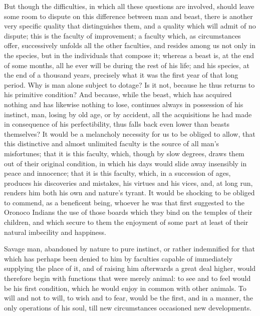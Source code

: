 \documentclass[11pt,twocolumn]{ltugboat}
\begin{document}
But though the difficulties, in which all these questions are
involved, should leave some room to dispute on this difference between
man and beast, there is another very specific quality that
distinguishes them, and a quality which will admit of no dispute; this
is the faculty of improvement; a faculty which, as circumstances
offer, successively unfolds all the other faculties, and resides among
us not only in the species, but in the individuals that compose it;
whereas a beast is, at the end of some months, all he ever will be
during the rest of his life; and his species, at the end of a thousand
years, precisely what it was the first year of that long period. Why
is man alone subject to dotage? Is it not, because he thus returns to
his primitive condition? And because, while the beast, which has
acquired nothing and has likewise nothing to lose, continues always in
possession of his instinct, man, losing by old age, or by accident,
all the acquisitions he had made in consequence of his perfectibility,
thus falls back even lower than beasts themselves? It would be a
melancholy necessity for us to be obliged to allow, that this
distinctive and almost unlimited faculty is the source of all man's
misfortunes; that it is this faculty, which, though by slow degrees,
draws them out of their original condition, in which his days would
slide away insensibly in peace and innocence; that it is this faculty,
which, in a succession of ages, produces his discoveries and mistakes,
his virtues and his vices, and, at long run, renders him both his own
and nature's tyrant. It would be shocking to be obliged to commend, as
a beneficent being, whoever he was that first suggested to the
Oronoco Indians the use of those boards which they bind on the
temples of their children, and which secure to them the enjoyment of
some part at least of their natural imbecility and happiness.

Savage man, abandoned by nature to pure instinct, or rather
indemnified for that which has perhaps been denied to him by faculties
capable of immediately supplying the place of it, and of raising him
afterwards a great deal higher, would therefore begin with functions
that were merely animal: to see and to feel would be his first
condition, which he would enjoy in common with other animals. To will
and not to will, to wish and to fear, would be the first, and in a
manner, the only operations of his soul, till new circumstances
occasioned new developments.
\end{document}
